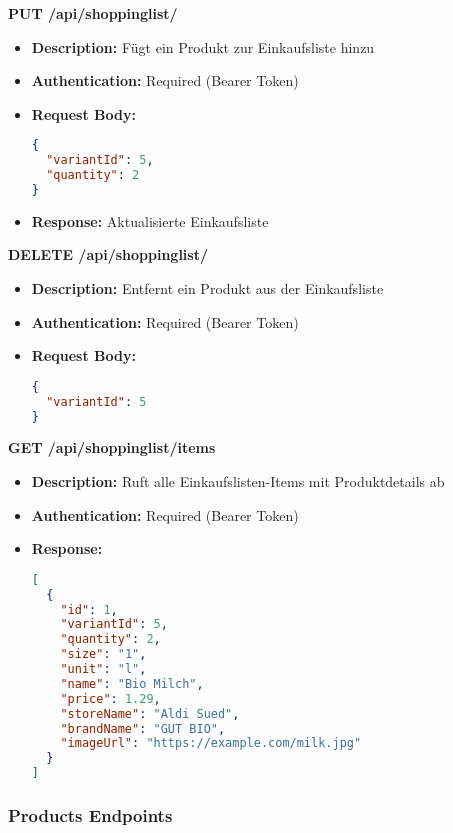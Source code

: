 \textbf{PUT /api/shoppinglist/}
\begin{itemize}
    \item \textbf{Description:} Fügt ein Produkt zur Einkaufsliste hinzu
    \item \textbf{Authentication:} Required (Bearer Token)
    \item \textbf{Request Body:}
    \begin{lstlisting}[language=JSON]
{
  "variantId": 5,
  "quantity": 2
}
    \end{lstlisting}
    \item \textbf{Response:} Aktualisierte Einkaufsliste
\end{itemize}

\textbf{DELETE /api/shoppinglist/}
\begin{itemize}
    \item \textbf{Description:} Entfernt ein Produkt aus der Einkaufsliste
    \item \textbf{Authentication:} Required (Bearer Token)
    \item \textbf{Request Body:}
    \begin{lstlisting}[language=JSON]
{
  "variantId": 5
}
    \end{lstlisting}
\end{itemize}

\textbf{GET /api/shoppinglist/items}
\begin{itemize}
    \item \textbf{Description:} Ruft alle Einkaufslisten-Items mit Produktdetails ab
    \item \textbf{Authentication:} Required (Bearer Token)
    \item \textbf{Response:}
    \begin{lstlisting}[language=JSON]
[
  {
    "id": 1,
    "variantId": 5,
    "quantity": 2,
    "size": "1",
    "unit": "l",
    "name": "Bio Milch",
    "price": 1.29,
    "storeName": "Aldi Sued",
    "brandName": "GUT BIO",
    "imageUrl": "https://example.com/milk.jpg"
  }
]
    \end{lstlisting}
\end{itemize}

\subsubsection{Products Endpoints}

